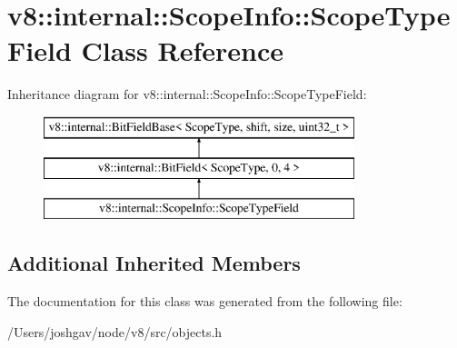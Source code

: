 \hypertarget{classv8_1_1internal_1_1_scope_info_1_1_scope_type_field}{}\section{v8\+:\+:internal\+:\+:Scope\+Info\+:\+:Scope\+Type\+Field Class Reference}
\label{classv8_1_1internal_1_1_scope_info_1_1_scope_type_field}
Inheritance diagram for v8\+:\+:internal\+:\+:Scope\+Info\+:\+:Scope\+Type\+Field\+:\begin{figure}[H]
\begin{center}
\leavevmode
\includegraphics[height=3.000000cm]{classv8_1_1internal_1_1_scope_info_1_1_scope_type_field}
\end{center}
\end{figure}
\subsection*{Additional Inherited Members}


The documentation for this class was generated from the following file\+:\begin{DoxyCompactItemize}
\item 
/\+Users/joshgav/node/v8/src/objects.\+h\end{DoxyCompactItemize}
